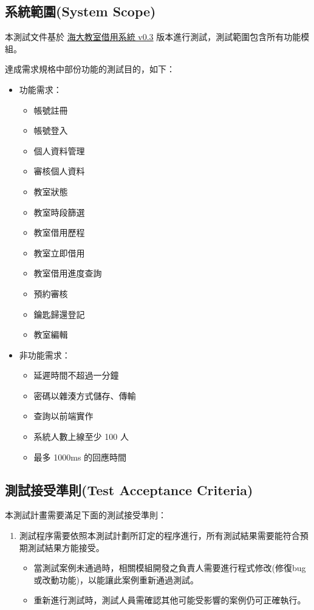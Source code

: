 \documentclass{article}
\begin{document}
\subsection[系統範圍(SYSTEM SCOPE)]{系統範圍(System Scope)}

本測試文件基於 \href{https://github.com/asas1asas200/NTOUClassroomBorrowing/releases/tag/v0.3}{海大教室借用系統 v0.3} 版本進行測試，測試範圍包含所有功能模組。

達成需求規格中部份功能的測試目的，如下：

\begin{itemize}
	\item 功能需求：
	      \begin{itemize}
		      \item 帳號註冊
		      \item 帳號登入
		      \item 個人資料管理
		      \item 審核個人資料
		      \item 教室狀態
		      \item 教室時段篩選
		      \item 教室借用歷程
		      \item 教室立即借用
		      \item 教室借用進度查詢
		      \item 預約審核
		      \item 鑰匙歸還登記
		      \item 教室編輯
	      \end{itemize}
	\item 非功能需求：
	      \begin{itemize}
		      \item 延遲時間不超過一分鐘
		      \item 密碼以雜湊方式儲存、傳輸
		      \item 查詢以前端實作
		      \item 系統人數上線至少 100 人
		      \item 最多 1000ms 的回應時間
	      \end{itemize}
\end{itemize}

\subsection[測試接受準則(TEST ACCEPTANCE CRITERIA)]{測試接受準則(Test Acceptance Criteria)}

本測試計畫需要滿足下面的測試接受準則：

\begin{enumerate}
	\color{blue}
	\item 測試程序需要依照本測試計劃所訂定的程序進行，所有測試結果需要能符合預期測試結果方能接受。
	      \begin{itemize}
		      \item 當測試案例未通過時，相關模組開發之負責人需要進行程式修改(修復bug或改動功能)，以能讓此案例重新通過測試。
		      \item 重新進行測試時，測試人員需確認其他可能受影響的案例仍可正確執行。
	      \end{itemize}
\end{enumerate}
\end{document}

